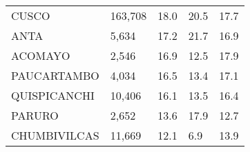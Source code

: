 \begin{tabular}{lllll}
	\cellcolor[HTML]{FF5050}CUSCO                                  & 163,708                                                               & 18.0                                                                             & 20.5                                                                        & 17.7                                                                                \\
	\cellcolor[HTML]{FF5050}ANTA                                   & 5,634                                                                 & 17.2                                                                             & 21.7                                                                        & 16.9                                                                                \\
	\cellcolor[HTML]{FF5050}ACOMAYO                                & 2,546                                                                 & 16.9                                                                             & 12.5                                                                        & 17.9                                                                                \\
	\cellcolor[HTML]{FF5050}PAUCARTAMBO                            & 4,034                                                                 & 16.5                                                                             & 13.4                                                                        & 17.1                                                                                \\
	\cellcolor[HTML]{FF5050}QUISPICANCHI                           & 10,406                                                                & 16.1                                                                             & 13.5                                                                        & 16.4                                                                                \\
	\cellcolor[HTML]{FF5050}PARURO                                 & 2,652                                                                 & 13.6                                                                             & 17.9                                                                        & 12.7                                                                                \\
	\cellcolor[HTML]{FF5050}CHUMBIVILCAS                           & 11,669                                                                & 12.1                                                                             & 6.9                                                                         & 13.9                                                                                \\

\end{tabular}
